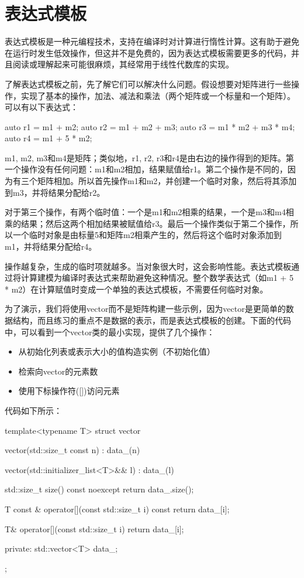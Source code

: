 \section{表达式模板}

表达式模板是一种元编程技术，支持在编译时对计算进行惰性计算。这有助于避免在运行时发生低效操作，但这并不是免费的，因为表达式模板需要更多的代码，并且阅读或理解起来可能很麻烦，其经常用于线性代数库的实现。

了解表达式模板之前，先了解它们可以解决什么问题。假设想要对矩阵进行一些操作，实现了基本的操作，加法、减法和乘法（两个矩阵或一个标量和一个矩阵）。可以有以下表达式：

\begin{cpp}
auto r1 = m1 + m2;
auto r2 = m1 + m2 + m3;
auto r3 = m1 * m2 + m3 * m4;
auto r4 = m1 + 5 * m2;
\end{cpp}

m1, m2, m3和m4是矩阵；类似地，r1, r2, r3和r4是由右边的操作得到的矩阵。第一个操作没有任何问题：m1和m2相加，结果赋值给r1。第二个操作是不同的，因为有三个矩阵相加。所以首先操作m1和m2，并创建一个临时对象，然后将其添加到m3，并将结果分配给r2。

对于第三个操作，有两个临时值：一个是m1和m2相乘的结果，一个是m3和m4相乘的结果；然后这两个相加结果被赋值给r3。最后一个操作类似于第二个操作，所以一个临时对象是由标量5和矩阵m2相乘产生的，然后将这个临时对象添加到m1，并将结果分配给r4。

操作越复杂，生成的临时项就越多。当对象很大时，这会影响性能。表达式模板通过将计算建模为编译时表达式来帮助避免这种情况。整个数学表达式（如m1 + 5 * m2）在计算赋值时变成一个单独的表达式模板，不需要任何临时对象。

为了演示，我们将使用vector而不是矩阵构建一些示例，因为vector是更简单的数据结构，而且练习的重点不是数据的表示，而是表达式模板的创建。下面的代码中，可以看到一个vector类的最小实现，提供了几个操作：

\begin{itemize}
\item
从初始化列表或表示大小的值构造实例（不初始化值）

\item
检索向vector的元素数

\item
使用下标操作符([])访问元素
\end{itemize}

代码如下所示：

\begin{cpp}
template<typename T>
struct vector
{
	vector(std::size_t const n) : data_(n) {}
	
	vector(std::initializer_list<T>&& l) : data_(l) {}
	
	std::size_t size() const noexcept
	{
		return data_.size();
	}

	T const & operator[](const std::size_t i) const
	{
		return data_[i];
	}

	T& operator[](const std::size_t i)
	{
		return data_[i];
	}

private:
	std::vector<T> data_;
};
\end{cpp}

